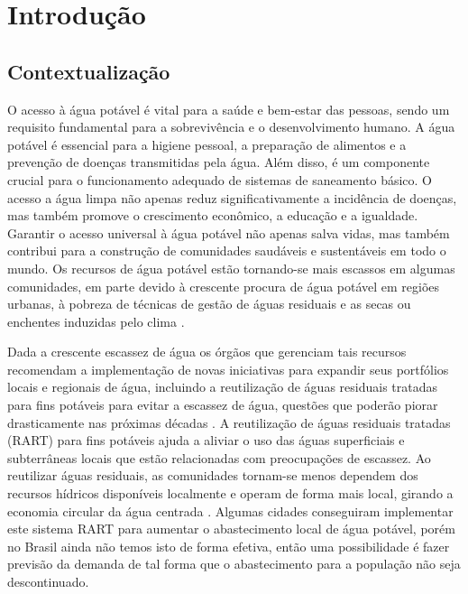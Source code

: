 


\section{Introdu{\c c}{\~a}o} \label{sec:int}

\subsection{Contextualiza\c c\~ao} \label{subsec:contexto}

O acesso à água potável é vital para a saúde e bem-estar das pessoas, sendo um requisito fundamental para a sobrevivência e o desenvolvimento humano. A água potável é essencial para a higiene pessoal, a preparação de alimentos e a prevenção de doenças transmitidas pela água. Além disso, é um componente crucial para o funcionamento adequado de sistemas de saneamento básico. O acesso a água limpa não apenas reduz significativamente a incidência de doenças, mas também promove o crescimento econômico, a educação e a igualdade. Garantir o acesso universal à água potável não apenas salva vidas, mas também contribui para a construção de comunidades saudáveis e sustentáveis em todo o mundo. Os recursos de água potável estão tornando-se mais escassos em algumas comunidades, em parte devido à crescente procura de água potável em regiões urbanas, à pobreza de técnicas de gestão de águas residuais e as secas ou enchentes induzidas pelo clima
\cite{10.2166/wp.2022.071}.

Dada a crescente escassez de água os órgãos que gerenciam tais recursos recomendam a implementação de novas iniciativas para expandir seus portfólios locais e regionais de água, incluindo a reutilização de águas residuais tratadas para fins potáveis para evitar a escassez de água, questões que poderão piorar drasticamente nas próximas décadas \cite{BARNES2023139587}. A reutilização de águas residuais tratadas (RART) para fins potáveis ajuda a aliviar o uso das águas superficiais e subterrâneas locais que estão relacionadas com preocupações de escassez. Ao reutilizar águas residuais, as comunidades tornam-se menos dependem dos recursos hídricos disponíveis localmente e operam de forma mais local, girando a economia circular da água centrada \cite{TSATSOU2023136325}. Algumas cidades conseguiram implementar este sistema RART para aumentar o abastecimento local de água potável, porém no Brasil ainda não temos isto de forma efetiva, então uma possibilidade é fazer previsão da demanda de tal forma que o abastecimento para a população não seja descontinuado. 

